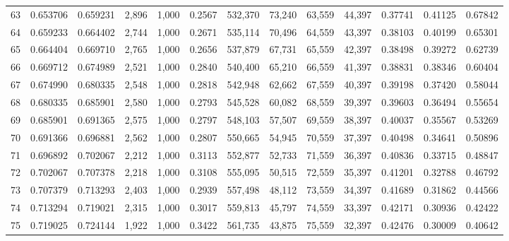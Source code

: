 \begin{tabular}{rrrrrrrrrrrrr}
63  &  0.653706 &  0.659231 &   2,896 &  1,000 &                                     0.2567 &  532,370 &   73,240 &   63,559 &   44,397 &  0.37741 &  0.41125 &  0.67842 \\
64  &  0.659233 &  0.664402 &   2,744 &  1,000 &                                     0.2671 &  535,114 &   70,496 &   64,559 &   43,397 &  0.38103 &  0.40199 &  0.65301 \\
65  &  0.664404 &  0.669710 &   2,765 &  1,000 &                                     0.2656 &  537,879 &   67,731 &   65,559 &   42,397 &  0.38498 &  0.39272 &  0.62739 \\
66  &  0.669712 &  0.674989 &   2,521 &  1,000 &                                     0.2840 &  540,400 &   65,210 &   66,559 &   41,397 &  0.38831 &  0.38346 &  0.60404 \\
67  &  0.674990 &  0.680335 &   2,548 &  1,000 &                                     0.2818 &  542,948 &   62,662 &   67,559 &   40,397 &  0.39198 &  0.37420 &  0.58044 \\
68  &  0.680335 &  0.685901 &   2,580 &  1,000 &                                     0.2793 &  545,528 &   60,082 &   68,559 &   39,397 &  0.39603 &  0.36494 &  0.55654 \\
69  &  0.685901 &  0.691365 &   2,575 &  1,000 &                                     0.2797 &  548,103 &   57,507 &   69,559 &   38,397 &  0.40037 &  0.35567 &  0.53269 \\
70  &  0.691366 &  0.696881 &   2,562 &  1,000 &                                     0.2807 &  550,665 &   54,945 &   70,559 &   37,397 &  0.40498 &  0.34641 &  0.50896 \\
71  &  0.696892 &  0.702067 &   2,212 &  1,000 &                                     0.3113 &  552,877 &   52,733 &   71,559 &   36,397 &  0.40836 &  0.33715 &  0.48847 \\
72  &  0.702067 &  0.707378 &   2,218 &  1,000 &                                     0.3108 &  555,095 &   50,515 &   72,559 &   35,397 &  0.41201 &  0.32788 &  0.46792 \\
73  &  0.707379 &  0.713293 &   2,403 &  1,000 &                                     0.2939 &  557,498 &   48,112 &   73,559 &   34,397 &  0.41689 &  0.31862 &  0.44566 \\
74  &  0.713294 &  0.719021 &   2,315 &  1,000 &                                     0.3017 &  559,813 &   45,797 &   74,559 &   33,397 &  0.42171 &  0.30936 &  0.42422 \\
75  &  0.719025 &  0.724144 &   1,922 &  1,000 &                                     0.3422 &  561,735 &   43,875 &   75,559 &   32,397 &  0.42476 &  0.30009 &  0.40642 \\

\end{tabular}
